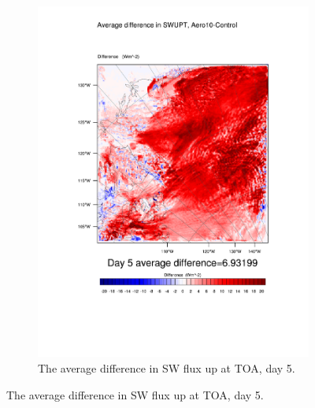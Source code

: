 \begin{figure}
\begin{subfigure}{0.48\textwidth}
		\includegraphics[width=\textwidth]{results/aero10/diff_Aero10_SWUPT_Day5.pdf}
		\caption{The average difference in SW flux up at TOA, day 5.}
		\label{subfig:swup_r3Day5}
	\end{subfigure}
	

\end{figure}
